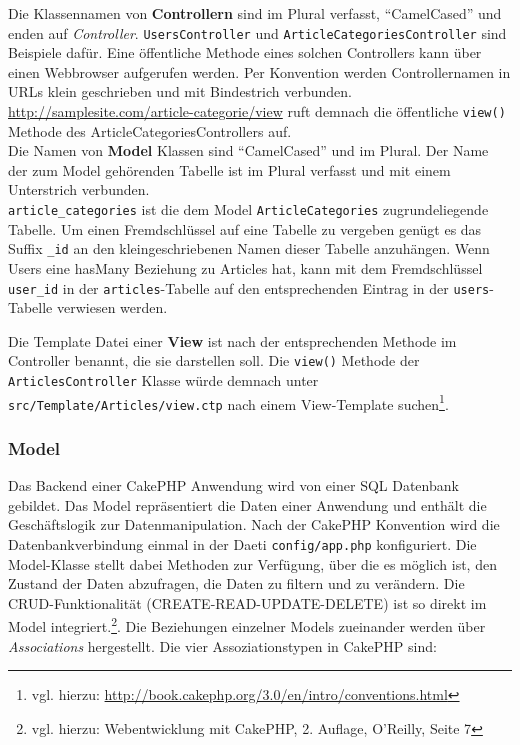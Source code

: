 	 Die Klassennamen von \textbf{Controllern} sind im Plural verfasst, \enquote{CamelCased} und enden auf \textit{Controller}. \texttt{UsersController} und \texttt{ArticleCategoriesController} sind Beispiele dafür. Eine öffentliche Methode eines solchen Controllers kann über einen Webbrowser aufgerufen werden. Per Konvention werden Controllernamen in URLs klein geschrieben und mit Bindestrich verbunden.
	\url{http://samplesite.com/article-categorie/view} ruft demnach die öffentliche \texttt{view()} Methode des ArticleCategoriesControllers auf.\\
	\newline
	Die Namen von \textbf{Model} Klassen sind \enquote{CamelCased} und im Plural. Der Name der zum Model gehörenden Tabelle ist im Plural verfasst und mit einem Unterstrich verbunden.\\
	\texttt{article\_categories} ist die dem Model \texttt{ArticleCategories} zugrundeliegende Tabelle. Um einen Fremdschlüssel auf eine Tabelle zu vergeben genügt es das Suffix \texttt{\_id} an den kleingeschriebenen Namen dieser Tabelle anzuhängen. Wenn Users eine hasMany Beziehung zu Articles hat, kann mit dem Fremdschlüssel \texttt{user\_id} in der \texttt{articles}-Tabelle auf den entsprechenden Eintrag in der \texttt{users}-Tabelle verwiesen werden. \newline
	
	Die Template Datei einer \textbf{View} ist nach der entsprechenden Methode im Controller benannt, die sie darstellen soll. Die \texttt{view()} Methode der \texttt{ArticlesController} Klasse würde demnach unter \texttt{src/Template/Articles/view.ctp} nach einem View-Template suchen\footnote{vgl. hierzu: \url{http://book.cakephp.org/3.0/en/intro/conventions.html}}.
	
	\subsubsection{Model}
	
	Das Backend einer CakePHP Anwendung wird von einer SQL Datenbank gebildet. Das Model repräsentiert die Daten einer Anwendung und enthält die Geschäftslogik zur Datenmanipulation. Nach der CakePHP Konvention wird die Datenbankverbindung einmal in der Daeti \texttt{config/app.php} konfiguriert. Die Model-Klasse stellt dabei Methoden zur Verfügung, über die es möglich ist, den Zustand der Daten abzufragen, die Daten zu filtern und zu verändern. Die CRUD-Funktionalität (CREATE-READ-UPDATE-DELETE) ist so direkt im Model integriert.\footnote{vgl. hierzu: Webentwicklung mit CakePHP, 2. Auflage, O'Reilly, Seite 7}. 
	Die Beziehungen einzelner Models zueinander werden über \textit{Associations} hergestellt. Die vier Assoziationstypen in CakePHP sind:\\

